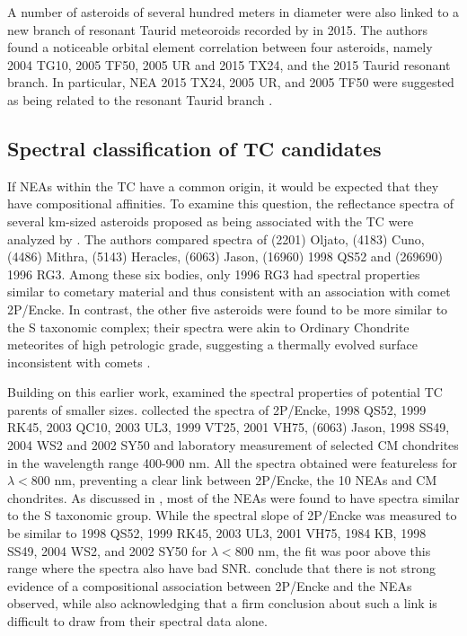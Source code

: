 \documentclass[letters,a4paper,fleqn,usenatbib]{mnras}
\begin{document}
A number of asteroids of several hundred meters in diameter were also linked to a new branch of resonant Taurid meteoroids recorded by \cite{Spurny2017} in 2015.
The authors found a noticeable orbital element correlation between  four asteroids, namely 2004 TG10, 2005 TF50, 2005 UR and 2015 TX24, and the 2015 Taurid resonant branch. In particular, NEA 2015 TX24, 2005 UR, and 2005 TF50 were suggested as being related to the resonant Taurid branch \citep{Spurny2017}.

\subsection{Spectral classification of TC candidates}

If NEAs within the TC have a common origin, it would be expected that they have compositional affinities. To examine this question, the reflectance spectra of several km-sized asteroids proposed as being associated with the TC were analyzed by \cite{Popescu2014}. The authors compared spectra of (2201) Oljato, (4183) Cuno, (4486) Mithra, (5143) Heracles, (6063) Jason, (16960) 1998 QS52 and (269690) 1996 RG3. Among these six bodies, only 1996 RG3 had spectral properties similar to cometary material and thus consistent with an association with comet 2P/Encke. In contrast, the other five asteroids were found to be more similar to the S taxonomic complex; their spectra were akin to Ordinary Chondrite meteorites of high petrologic grade, suggesting a thermally evolved surface inconsistent with comets \citep{Popescu2014}.

Building on this earlier work, \cite{Tubiana2015} examined the spectral properties of potential TC parents of smaller sizes. \cite{Tubiana2015} collected the spectra of 2P/Encke, 1998 QS52, 1999 RK45, 2003 QC10, 2003 UL3, 1999 VT25, 2001 VH75, (6063) Jason, 1998 SS49, 2004 WS2 and 2002 SY50 and laboratory measurement of selected CM chondrites in the wavelength range 400-900 nm. All the spectra obtained were featureless for $\lambda<$800 nm, preventing a clear link between 2P/Encke, the 10 NEAs and CM chondrites. As discussed in \cite{Popescu2014}, most of the NEAs were found to have spectra  similar to the S taxonomic group. While the spectral slope of 2P/Encke was measured to be similar to 1998 QS52, 1999 RK45, 2003 UL3, 2001 VH75, 1984 KB, 1998 SS49, 2004 WS2, and
2002 SY50 for $\lambda<$800 nm, the fit was poor above this range where the spectra also have bad SNR. \cite{Tubiana2015} conclude that there is not strong evidence of a compositional association between 2P/Encke and the NEAs observed, while also acknowledging that a firm conclusion about such a link is difficult to draw from their spectral data alone.  
\end{document}

